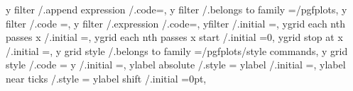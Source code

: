 {{{{{{{y filter                      /.append expression                                                                                                          /.code=,
y filter                      /.belongs to family                                                                                                                =/pgfplots,
y filter                      /.code                                                                                                                             ={},
y filter                      /.expression                                                                                                                 /.code=,
yfilter                       /.initial                                                                                                                          =,%
ygrid each nth passes x       /.initial                                                                                                                          =,
ygrid each nth passes x start /.initial                                                                                                                          =0,
ygrid stop at x               /.initial                                                                                                                          =,
y grid style                  /.belongs to family                                                                                                                =/pgfplots/style commands,
y grid style                  /.code                                                                                                                             ={%
y                             /.initial                                                                                                                          =,%
ylabel absolute               /.style                                                                                                                            ={%
ylabel                        /.initial                                                                                                                          =,
ylabel near ticks             /.style                                                                                                                            ={%
ylabel shift                  /.initial                                                                                                                          =0pt,
}}}}}}}}}}
